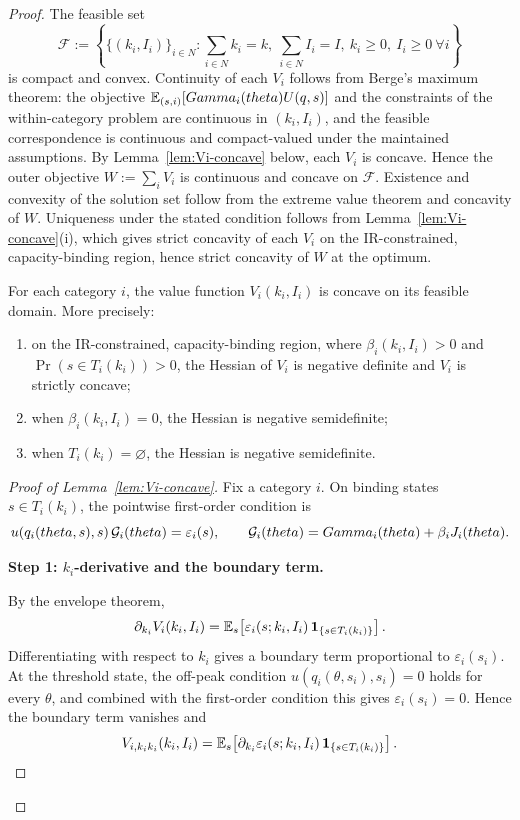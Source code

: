 \documentclass[master.tex]{subfiles}
\begin{document}
\begin{proof}
The feasible set
\[
\mathcal F := \left\{ \{(k_i,I_i)\}_{i\in N} : \sum_{i\in N} k_i = k,\ \sum_{i\in N} I_i = I,\ k_i\ge 0,\ I_i\ge 0\ \forall i \right\}
\]
is compact and convex. Continuity of each $V_i$ follows from Berge's maximum theorem: the objective $\mathbb{E}_{(s,i)}[Gamma_i(theta)U(q,s)]$ and the constraints of the within-category problem are continuous in $(k_i,I_i)$, and the feasible correspondence is continuous and compact-valued under the maintained assumptions. By Lemma~\ref{lem:Vi-concave} below, each $V_i$ is concave. Hence the outer objective $W:=\sum_i V_i$ is continuous and concave on $\mathcal F$. Existence and convexity of the solution set follow from the extreme value theorem and concavity of $W$. Uniqueness under the stated condition follows from Lemma~\ref{lem:Vi-concave}(i), which gives strict concavity of each $V_i$ on the IR-constrained, capacity-binding region, hence strict concavity of $W$ at the optimum.

\begin{lemma}\label{lem:Vi-concave}
For each category $i$, the value function $V_i(k_i,I_i)$ is concave on its feasible domain. More precisely:

\begin{enumerate}[label=(\roman*), leftmargin=1cm]
    \item on the IR-constrained, capacity-binding region, where $\beta_i(k_i,I_i)>0$ and $\Pr(s\in T_i(k_i))>0$, the Hessian of $V_i$ is negative definite and $V_i$ is strictly concave;
    \item when $\beta_i(k_i,I_i)=0$, the Hessian is negative semidefinite;
    \item when $T_i(k_i)=\varnothing$, the Hessian is negative semidefinite.
\end{enumerate}
\end{lemma}

\begin{proof}[Proof of Lemma~\ref{lem:Vi-concave}]
Fix a category $i$. On binding states $s\in T_i(k_i)$, the pointwise first-order condition is
\[
u\!\left(q_i(theta,s),s\right)\mathcal{G}_i(theta)=\varepsilon_i(s), \qquad \mathcal{G}_i(theta)=Gamma_i(theta)+\beta_i J_i(theta).
\]


\noindent\textbf{Step 1: \(k_i\)-derivative and the boundary term.}

By the envelope theorem,
\[
\partial_{k_i}V_i(k_i,I_i) = \mathbb{E}_s\!\left[\varepsilon_i(s;k_i,I_i)\,\mathbf{1}_{\{s\in T_i(k_i)\}}\right].
\]
Differentiating with respect to $k_i$ gives a boundary term proportional to $\varepsilon_i(s_i)$. At the threshold state, the off-peak condition $u(q_i(\theta,s_i),s_i)=0$ holds for every $\theta$, and combined with the first-order condition this gives $\varepsilon_i(s_i)=0$. Hence the boundary term vanishes and
\[
V_{i,k_ik_i}(k_i,I_i) = \mathbb{E}_s\!\left[\partial_{k_i}\varepsilon_i(s;k_i,I_i)\,\mathbf{1}_{\{s\in T_i(k_i)\}}\right].
\]



\end{proof}
\end{proof}
\end{document}
